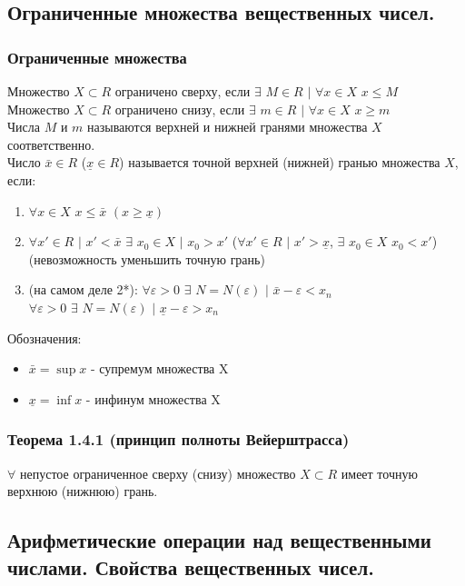 \documentclass[12pt]{article}
\begin{document}
    \subsection{Ограниченные множества вещественных чисел.}
    \subsubsection*{Ограниченные множества}
    \noindent Множество $X \subset R$ ограничено сверху, если $\exists$ $M \in R$ $|$ $\forall x \in X$ $x \le M$\\
    Множество $X \subset R$ ограничено снизу, если $\exists$ $m \in R$ $|$ $\forall x \in X$ $x \ge m$\\
    Числа $M$ и $m$ называются верхней и нижней гранями множества $X$ соответственно.\\
    Число $\bar{x} \in R$ ($\underline{x} \in R$) называется точной верхней (нижней) гранью множества $X$, если:
    \begin{enumerate}
        \item $\forall x \in X$ $x \le \bar{x}$ $(x \ge \underline{x})$
        \item $\forall x' \in R$ $|$ $x' < \bar{x}$ $\exists$ $x_{0} \in X$ $|$ $x_{0} > x'$ ($\forall x' \in R$ $|$ $x' > \underline{x}$, $\exists$ $x_{0} \in X$ $x_{0} < x'$) (невозможность уменьшить точную грань)
        \item (на самом деле 2*): $\forall \varepsilon > 0$ $\exists$ $N = N(\varepsilon)$ $|$ $\bar{x} - \varepsilon < x_n$\\
        $\forall \varepsilon > 0$ $\exists$ $N = N(\varepsilon)$ $|$ $\underline{x} - \varepsilon > x_n$
    \end{enumerate} 
    Обозначения:
    \begin{itemize}
        \item $\bar{x} = \sup x$ - супремум множества X
        \item $\underline{x} = \inf x$ - инфинум множества X
    \end{itemize}
    \subsubsection*{Теорема 1.4.1 (принцип полноты Вейерштрасса)}\label{th:1.4.1}
    $\forall$ непустое ограниченное сверху (снизу) множество $X \subset R$ имеет точную верхнюю (нижнюю) грань.

    \subsection{Арифметические операции над вещественными числами. Свойства вещественных чисел.}
\end{document}
